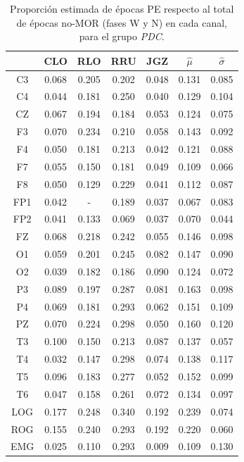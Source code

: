 \begin{table}
\centering
\begin{tabular}{c|cccc|cc}
& CLO & RLO & RRU & JGZ & $\widehat{\mu}$ & $\widehat{\sigma}$ \\
\hline
 C3 & 0.068    & 0.205    & 0.202    & 0.048    & 0.131    & 0.085     \\
 C4 & 0.044    & 0.181    & 0.250    & 0.040    & 0.129    & 0.104     \\
 CZ & 0.067    & 0.194    & 0.184    & 0.053    & 0.124    & 0.075     \\
 F3 & 0.070    & 0.234    & 0.210    & 0.058    & 0.143    & 0.092     \\
 F4 & 0.050    & 0.181    & 0.213    & 0.042    & 0.121    & 0.088     \\
 F7 & 0.055    & 0.150    & 0.181    & 0.049    & 0.109    & 0.066     \\
 F8 & 0.050    & 0.129    & 0.229    & 0.041    & 0.112    & 0.087     \\
 FP1 & 0.042    & -      & 0.189    & 0.037    & 0.067    & 0.083     \\
 FP2 & 0.041    & 0.133    & 0.069    & 0.037    & 0.070    & 0.044     \\
 FZ & 0.068    & 0.218    & 0.242    & 0.055    & 0.146    & 0.098     \\
 O1 & 0.059    & 0.201    & 0.245    & 0.082    & 0.147    & 0.090     \\
 O2 & 0.039    & 0.182    & 0.186    & 0.090    & 0.124    & 0.072     \\
 P3 & 0.089    & 0.197    & 0.287    & 0.081    & 0.163    & 0.098     \\
 P4 & 0.069    & 0.181    & 0.293    & 0.062    & 0.151    & 0.109     \\
 PZ & 0.070    & 0.224    & 0.298    & 0.050    & 0.160    & 0.120     \\
 T3 & 0.100    & 0.150    & 0.213    & 0.087    & 0.137    & 0.057     \\
 T4 & 0.032    & 0.147    & 0.298    & 0.074    & 0.138    & 0.117     \\
 T5 & 0.096    & 0.183    & 0.277    & 0.052    & 0.152    & 0.099     \\
 T6 & 0.047    & 0.158    & 0.261    & 0.072    & 0.134    & 0.097     \\
 LOG & 0.177    & 0.248    & 0.340    & 0.192    & 0.239    & 0.074     \\
 ROG & 0.155    & 0.240    & 0.293    & 0.192    & 0.220    & 0.060     \\
 EMG & 0.025    & 0.110    & 0.293    & 0.009    & 0.109    & 0.130    
\end{tabular}
\caption{Proporci\'on estimada de \'epocas PE respecto al total de \'epocas
no-MOR (fases W y N) en cada
canal, para el grupo \textit{PDC}.}
\label{gpo_mn_nmor}
\end{table}

